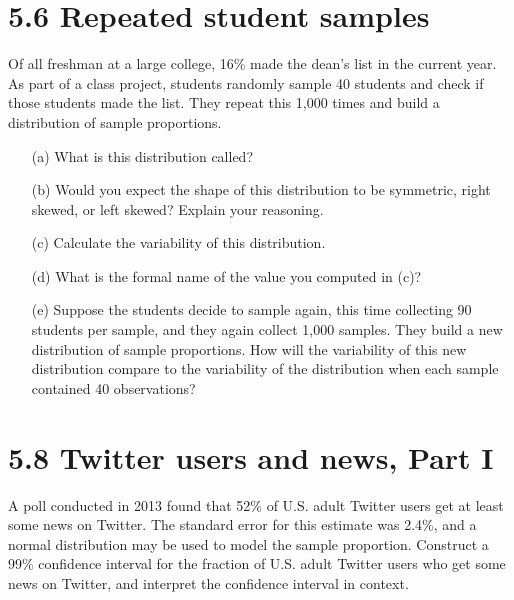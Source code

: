 \documentclass{article}
\begin{document}
\section*{5.6 Repeated student samples}
Of all freshman at a large college, 16\% made the dean’s list in the current year. As part of a class project, students randomly sample 40 students and check if those students made the list. They repeat this 1,000 times and build a distribution of sample proportions.
\begin{itemize}
    \item[(a)] What is this distribution called?
    \item[(b)] Would you expect the shape of this distribution to be symmetric, right skewed, or left skewed? Explain your reasoning.
    \item[(c)] Calculate the variability of this distribution.
    \item[(d)] What is the formal name of the value you computed in (c)?
    \item[(e)] Suppose the students decide to sample again, this time collecting 90 students per sample, and they again collect 1,000 samples. They build a new distribution of sample proportions. How will the variability of this new distribution compare to the variability of the distribution when each sample contained 40 observations?
\end{itemize}


\section*{5.8 Twitter users and news, Part I}
A poll conducted in 2013 found that 52\% of U.S. adult Twitter users get at least some news on Twitter. The standard error for this estimate was 2.4\%, and a normal distribution may be used to model the sample proportion. Construct a 99\% confidence interval for the fraction of U.S. adult Twitter users who get some news on Twitter, and interpret the confidence interval in context.
\end{document}
